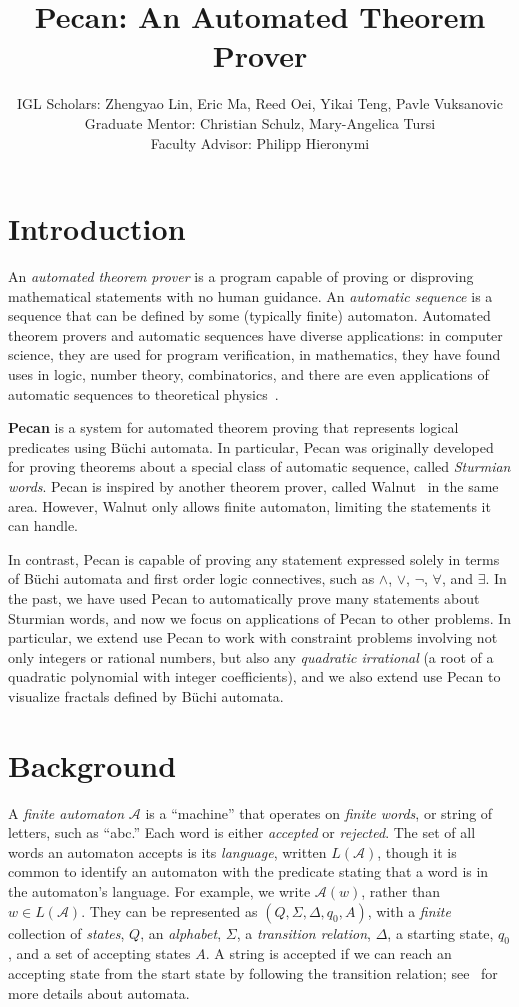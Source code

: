 \documentclass[10pt,usenames,dvipsnames]{article}
\title{Pecan: An Automated Theorem Prover}
\author{%
IGL Scholars: Zhengyao Lin, Eric Ma, Reed Oei, Yikai Teng, Pavle Vuksanovic \\
Graduate Mentor: Christian Schulz, Mary-Angelica Tursi \\
Faculty Advisor: Philipp Hieronymi%
}
\begin{document}
\maketitle

\section{Introduction}

An \emph{automated theorem prover} is a program capable of proving or disproving mathematical statements with no human guidance. 
An \emph{automatic sequence} is a sequence that can be defined by some (typically finite) automaton.
Automated theorem provers and automatic sequences have diverse applications: in computer science, they are used for program verification, in mathematics, they have found uses in logic, number theory, combinatorics, and there are even applications of automatic sequences to theoretical physics~\cite{auto_seq}.

\textbf{Pecan} is a system for automated theorem proving that represents logical predicates using B\"uchi automata.
In particular, Pecan was originally developed for proving theorems about a special class of automatic sequence, called \emph{Sturmian words}.
Pecan is inspired by another theorem prover, called Walnut~\cite{walnut} in the same area.
However, Walnut only allows finite automaton, limiting the statements it can handle.

In contrast, Pecan is capable of proving any statement expressed solely in terms of B\"uchi automata and first order logic connectives, such as $\wedge$, $\vee$, $\neg$, $\forall$, and $\exists$.
In the past, we have used Pecan to automatically prove many statements about Sturmian words, and now we focus on applications of Pecan to other problems.
In particular, we extend use Pecan to work with constraint problems involving not only integers or rational numbers, but also any \emph{quadratic irrational} (a root of a quadratic polynomial with integer coefficients), and we also extend use Pecan to visualize fractals defined by B\"uchi automata.

\section{Background}

A \emph{finite automaton} $\mathcal{A}$ is a ``machine'' that operates on \emph{finite words}, or string of letters, such as ``abc.''
Each word is either \emph{accepted} or \emph{rejected}.
The set of all words an automaton accepts is its \emph{language}, written $L(\mathcal{A})$, though it is common to identify an automaton with the predicate stating that a word is in the automaton's language.
For example, we write $\mathcal{A}(w)$, rather than $w \in L(\mathcal{A})$.
They can be represented as $(Q, \Sigma, \Delta, q_0, A)$, with a \emph{finite} collection of \emph{states}, $Q$, an \emph{alphabet}, $\Sigma$, a \emph{transition relation}, $\Delta$, a starting state, $q_0$, and a set of accepting states $A$.
A string is accepted if we can reach an accepting state from the start state by following the transition relation; see~\cite{aut_theory} for more details about automata.
\end{document}
